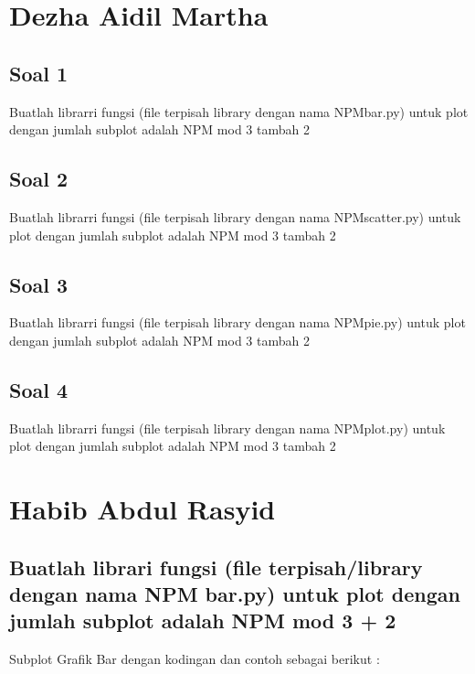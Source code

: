 \section{Dezha Aidil Martha}
\subsection{Soal 1}
Buatlah librarri fungsi (file terpisah library dengan nama NPMbar.py) untuk plot dengan jumlah subplot adalah NPM mod 3 tambah 2



\subsection{Soal 2}
Buatlah librarri fungsi (file terpisah library dengan nama NPMscatter.py) untuk plot dengan jumlah subplot adalah NPM mod 3 tambah  2



\subsection{Soal 3}
Buatlah librarri fungsi (file terpisah library dengan nama NPMpie.py) untuk plot dengan jumlah subplot adalah NPM mod 3 tambah 2



\subsection{Soal 4}
Buatlah librarri fungsi (file terpisah library dengan nama NPMplot.py) untuk plot dengan jumlah subplot adalah NPM mod 3 tambah  2


\section{Habib Abdul Rasyid}
\subsection{Buatlah librari fungsi (ﬁle terpisah/library dengan nama NPM bar.py) untuk plot dengan jumlah subplot adalah NPM mod 3 + 2}
Subplot Grafik Bar dengan kodingan dan contoh sebagai berikut :


